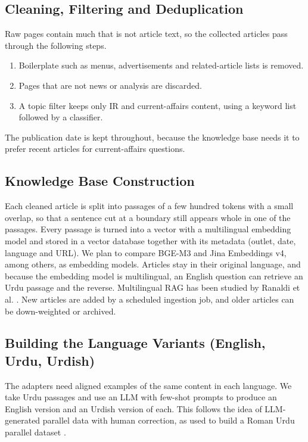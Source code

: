 \documentclass{FastFyp}
\begin{document}
\subsection{Cleaning, Filtering and Deduplication}
Raw pages contain much that is not article text, so the collected articles pass through the following steps.

\begin{enumerate}
  \item Boilerplate such as menus, advertisements and related-article lists is removed.
  \item Pages that are not news or analysis are discarded.
  \item A topic filter keeps only IR and current-affairs content, using a keyword list followed by a classifier.
\end{enumerate}

The publication date is kept throughout, because the knowledge base needs it to prefer recent articles for current-affairs questions.

\subsection{Knowledge Base Construction}
Each cleaned article is split into passages of a few hundred tokens with a small overlap, so that a sentence cut at a boundary still appears whole in one of the passages. Every passage is turned into a vector with a multilingual embedding model and stored in a vector database together with its metadata (outlet, date, language and URL). We plan to compare BGE-M3 and Jina Embeddings v4, among others, as embedding models. Articles stay in their original language, and because the embedding model is multilingual, an English question can retrieve an Urdu passage and the reverse. Multilingual RAG has been studied by Ranaldi et al. \cite{ranaldi2026multilingual}. New articles are added by a scheduled ingestion job, and older articles can be down-weighted or archived.

\subsection{Building the Language Variants (English, Urdu, Urdish)}
The adapters need aligned examples of the same content in each language. We take Urdu passages and use an LLM with few-shot prompts to produce an English version and an Urdish version of each. This follows the idea of LLM-generated parallel data with human correction, as used to build a Roman Urdu parallel dataset \cite{furqan2024erupd}.
\end{document}
